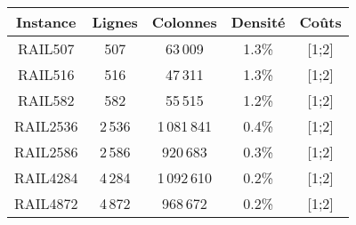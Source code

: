 \begin{tabular}{ccccc}
	\toprule
	Instance & Lignes & Colonnes & Densité & Coûts\\
	\midrule
	RAIL507 & 507 & 63\,009 & 1.3\% & [1;2]\\
	RAIL516 & 516 & 47\,311 & 1.3\% & [1;2]\\
	RAIL582 & 582 & 55\,515 & 1.2\% & [1;2]\\
	RAIL2536 & 2\,536 & 1\,081\,841 & 0.4\% & [1;2]\\
	RAIL2586 & 2\,586 & 920\,683 & 0.3\% & [1;2]\\
	RAIL4284 & 4\,284 & 1\,092\,610 & 0.2\% & [1;2]\\
	RAIL4872 & 4\,872 & 968\,672 & 0.2\% & [1;2]\\
	\bottomrule
\end{tabular}
